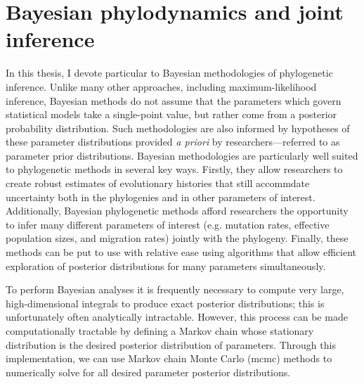 \section{Bayesian phylodynamics and joint inference}

In this thesis, I devote particular to Bayesian methodologies of phylogenetic inference. %
Unlike many other approaches, including maximum-likelihood inference, Bayesian methods do not assume that the parameters which govern statistical models take a single-point value, but rather come from a posterior probability distribution.
Such methodologies are also informed by hypotheses of these parameter distributions provided \textit{a priori} by researchers---referred to as parameter prior distributions.
Bayesian methodologies are particularly well suited to phylogenetic methods in several key ways.
Firstly, they allow researchers to create robust estimates of evolutionary histories that still accommdate uncertainty both in the phylogenies and in other parameters of interest. %
Additionally, Bayesian phylogenetic methods afford researchers the opportunity to infer many different parameters of interest (e.g. mutation rates, effective population sizes, and migration rates) jointly with the phylogeny.
Finally, these methods can be put to use with relative ease using algorithms that allow efficient exploration of posterior distributions for many parameters simultaneously. %

To perform Bayesian analyses it is frequently necessary to compute very large, high-dimensional integrals to produce exact posterior distributions; this is unfortunately often analytically intractable.
However, this process can be made computationally tractable by defining a Markov chain whose stationary distribution is the desired posterior distribution of parameters.
Through this implementation, we can use Markov chain Monte Carlo (\gls{mcmc}) methods to numerically solve for all desired parameter posterior distributions.

